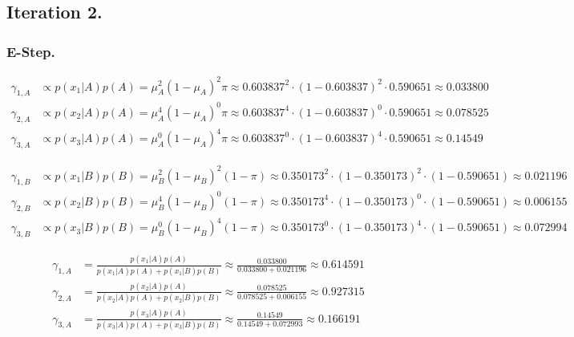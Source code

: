 \documentclass[12pt]{article}
\begin{document}
	\subsection*{Iteration 2.}

	\subsubsection*{E-Step.}

	\begin{align*}
		\gamma_{1,A} &\propto p\left(x_1 \vert A\right) p\left(A\right)
		= \mu_A^2 \left(1-\mu_A \right)^2 \pi
		\approx 0.603837^2 \cdot \left(1-0.603837\right)^2 \cdot 0.590651
		\approx 0.033800 \\
		\gamma_{2,A} &\propto p\left(x_2 \vert A\right) p\left(A\right)
		= \mu_A^4 \left(1-\mu_A\right)^0 \pi
		\approx 0.603837^4 \cdot \left(1-0.603837\right)^0 \cdot 0.590651
		\approx 0.078525 \\
		\gamma_{3,A} &\propto p\left(x_3 \vert A\right) p\left(A\right)
		= \mu_A^0 \left(1-\mu_A\right)^4 \pi
		\approx 0.603837^0 \cdot \left(1-0.603837\right)^4 \cdot 0.590651
		\approx 0.14549
	\end{align*}

	\begin{align*}
		\gamma_{1,B} &\propto p\left(x_1 \vert B\right) p\left(B\right)
		= \mu_B^2 \left(1-\mu_B \right)^2 \left(1-\pi\right)
		\approx 0.350173^2 \cdot \left(1-0.350173\right)^2 \cdot \left(1-0.590651\right)
		\approx 0.021196 \\
		\gamma_{2,B} &\propto p\left(x_2 \vert B\right) p\left(B\right)
		= \mu_B^4 \left(1-\mu_B\right)^0 \left(1-\pi\right)
		\approx 0.350173^4 \cdot \left(1-0.350173\right)^0 \cdot \left(1-0.590651\right)
		\approx 0.006155 \\
		\gamma_{3,B} &\propto p\left(x_3 \vert B\right) p\left(B\right)
		= \mu_B^0 \left(1-\mu_B\right)^4 \left(1-\pi\right)
		\approx 0.350173^0 \cdot \left(1-0.350173\right)^4 \cdot \left(1-0.590651\right)
		\approx 0.072994
	\end{align*}

	\begin{align*}
		\gamma_{1,A} &= \frac{p\left(x_1 \vert A\right) p\left(A\right)}
		{p\left(x_1 \vert A\right) p\left(A\right)
		+ p\left(x_1 \vert B\right) p\left(B\right)}
		\approx \frac{0.033800}{0.033800+0.021196} \approx 0.614591 \\
		\gamma_{2,A} &= \frac{p\left(x_2 \vert A\right) p\left(A\right)}
		{p\left(x_2 \vert A\right) p\left(A\right)
		+ p\left(x_2 \vert B\right) p\left(B\right)}
		\approx \frac{0.078525}{0.078525+0.006155} \approx 0.927315 \\
		\gamma_{3,A} &= \frac{p\left(x_3 \vert A\right) p\left(A\right)}
		{p\left(x_3 \vert A\right) p\left(A\right)
		+ p\left(x_3 \vert B\right) p\left(B\right)}
		\approx \frac{0.14549}{0.14549+0.072993} \approx 0.166191
	\end{align*}
\end{document}
